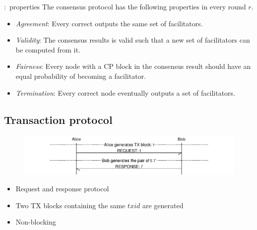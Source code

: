 \documentclass{beamer}
\begin{document}
\begin{frame}{\subsecname:~properties}
\label{def:consensus}
The consensus protocol has the following properties in every round $r$.
\begin{itemize}
    \item \emph{Agreement}:
        Every correct outputs the same set of facilitators.
    \item \emph{Validity}:
      The consensus results is valid such that a new set of facilitators can be computed from it.
    \item \emph{Fairness}:
        Every node with a CP block in the consensus result should have an equal probability of becoming a facilitator.
    \item \emph{Termination}:
        Every correct node eventually outputs a set of facilitators.
\end{itemize}
\end{frame}

\subsection{Transaction protocol}
\begin{frame}{\subsecname}
  \begin{figure}[h]
  \includegraphics[width=1.0\textwidth]{tx-proto}
  \centering
  \end{figure}
\begin{itemize}
\item Request and response protocol
\item Two TX blocks containing the same $txid$ are generated
\item Non-blocking
\end{itemize}
\end{frame}
\end{document}
